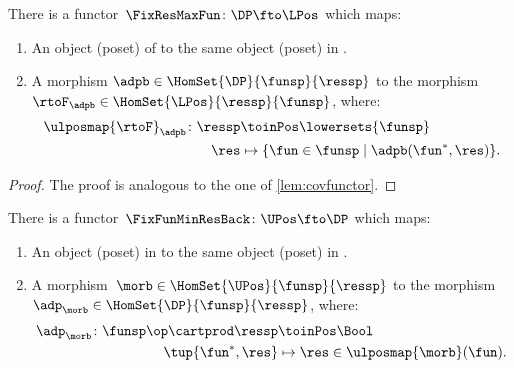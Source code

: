 \begin{lemma}
	\label{lem:confunctor}
	There is a functor~$\FixResMaxFun\colon \DP \fto \LPos$ which maps:
	\begin{enumerate}
		\item An object (poset) of \DP to the same object (poset) in \LPos.
		\item A morphism $\adpb \in \HomSet{\DP}{\funsp}{\ressp}$ to the morphism~$\rtoF_\adpb\in \HomSet{\LPos}{\ressp}{\funsp}$, where:
		      \begin{equation*}
			      \begin{aligned}
				      \ulposmap{\rtoF}_\adpb\colon \ressp & \toinPos \lowersets{\funsp}                           \\
				      \res                                & \mapsto \{ \fun \in \funsp \mid \adpb(\fun^*,\res)\}.
			      \end{aligned}
		      \end{equation*}
	\end{enumerate}
\end{lemma}

\begin{proof}
	The proof is analogous to the one of \cref{lem:covfunctor}.
\end{proof}

\begin{lemma}
	\label{lem:covfunctorback}
	There is a functor~$\FixFunMinResBack\colon \UPos \fto \DP$ which maps:
	\begin{enumerate}
		\item An object (poset) in \UPos to the same object (poset) in \DP.
		\item A morphism~$\morb\in \HomSet{\UPos}{\funsp}{\ressp}$ to the morphism~$\adp_\morb \in \HomSet{\DP}{\funsp}{\ressp}$, where:
		      \begin{equation}
			      \begin{aligned}
				      \adp_\morb\colon \funsp\op \cartprod \ressp & \toinPos \Bool                           \\
				      \tup{\fun^*,\res}                           & \mapsto \res \in \ulposmap{\morb}(\fun).
			      \end{aligned}
		      \end{equation}
	\end{enumerate}
\end{lemma}

